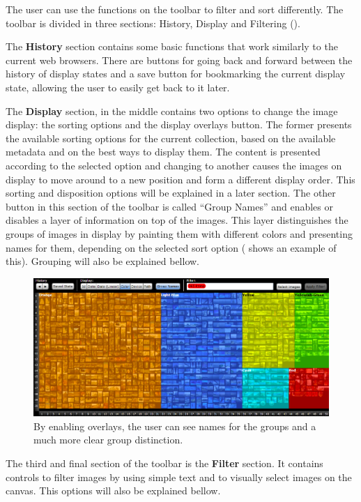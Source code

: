 The user can use the functions on the toolbar to filter and sort differently. The toolbar is divided in three sections: History, Display and Filtering ().

The \textbf{History} section contains some basic functions that work similarly to the current web browsers. There are buttons for going back and forward between the history of display states and a save button for bookmarking the current display state, allowing the user to easily get back to it later.

The \textbf{Display} section, in the middle contains two options to change the image display: the sorting options and the display overlays button. The former presents the available sorting options for the current collection, based on the available metadata and on the best ways to display them. The content is presented according to the selected option and changing to another causes the images on display to move around to a new position and form a different display order. This sorting and disposition options will be explained in a later section.
The other button in this section of the toolbar is called ``Group Names'' and enables or disables a layer of information on top of the images. This layer distinguishes the groups of images in display by painting them with different colors and presenting names for them, depending on the selected sort option ( shows an example of this). Grouping will also be explained bellow. 

\begin{figure}[htbp]
	\centering
		\includegraphics[width=\linewidth]{Figures/overlays.png}
	\caption[Overlays in Eagle Eye]{By enabling overlays, the user can see names for the groups and a much more clear group distinction.}
	\label{fig:overlays}
\end{figure}

The third and final section of the toolbar is the \textbf{Filter} section. It contains controls to filter images by using simple text and to visually select images on the canvas. This options will also be explained bellow.



